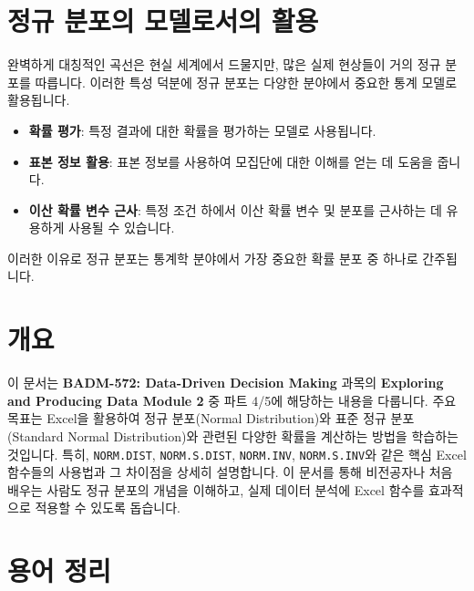 \documentclass[11pt,a4paper]{article}
\theoremstyle{definition}
\begin{document}
\newpage
\section{정규 분포의 모델로서의 활용}
완벽하게 대칭적인 곡선은 현실 세계에서 드물지만, 많은 실제 현상들이 거의 정규 분포를 따릅니다. 이러한 특성 덕분에 정규 분포는 다양한 분야에서 중요한 통계 모델로 활용됩니다.

\begin{infobox}[정규 분포의 활용]
\begin{itemize}
    \item \textbf{확률 평가}: 특정 결과에 대한 확률을 평가하는 모델로 사용됩니다.
    \item \textbf{표본 정보 활용}: 표본 정보를 사용하여 모집단에 대한 이해를 얻는 데 도움을 줍니다.
    \item \textbf{이산 확률 변수 근사}: 특정 조건 하에서 이산 확률 변수 및 분포를 근사하는 데 유용하게 사용될 수 있습니다.
\end{itemize}
이러한 이유로 정규 분포는 통계학 분야에서 가장 중요한 확률 분포 중 하나로 간주됩니다.
\end{infobox}

\newpage
\section{개요}
이 문서는 \textbf{BADM-572: Data-Driven Decision Making} 과목의 \textbf{Exploring and Producing Data Module 2} 중 파트 4/5에 해당하는 내용을 다룹니다.
주요 목표는 Excel을 활용하여 정규 분포(Normal Distribution)와 표준 정규 분포(Standard Normal Distribution)와 관련된 다양한 확률을 계산하는 방법을 학습하는 것입니다.
특히, \texttt{NORM.DIST}, \texttt{NORM.S.DIST}, \texttt{NORM.INV}, \texttt{NORM.S.INV}와 같은 핵심 Excel 함수들의 사용법과 그 차이점을 상세히 설명합니다.
이 문서를 통해 비전공자나 처음 배우는 사람도 정규 분포의 개념을 이해하고, 실제 데이터 분석에 Excel 함수를 효과적으로 적용할 수 있도록 돕습니다.

\newpage
\section{용어 정리}
\end{document}
